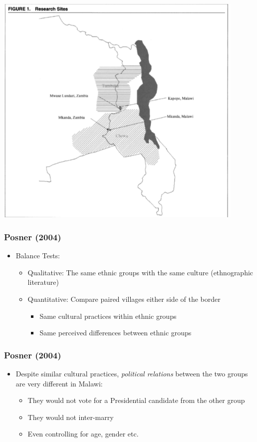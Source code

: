 \documentclass[xcolor=x11names,compress]{beamer}\usepackage[]{graphicx}\usepackage[]{color}
\renewcommand{\(}{\begin{columns}}
\renewcommand{\)}{\end{columns}}
\newcommand{\<}[1]{\begin{column}{#1}}
\renewcommand{\>}{\end{column}}
\begin{document}
\begin{frame}
\includegraphics[width=0.9\textwidth]{Posner_map.png}
\end{frame}

\begin{frame}
\frametitle{Posner (2004)}
\begin{itemize}
\item Balance Tests:
\begin{itemize}
\item Qualitative: The same ethnic groups with the same culture (ethnographic literature)
\pause
\item Quantitative: Compare paired villages either side of the border
\pause
\begin{itemize}
\item Same cultural practices within ethnic groups
\pause
\item Same perceived differences between ethnic groups
\end{itemize}
\end{itemize}
\end{itemize}
\end{frame}

\begin{frame}
\frametitle{Posner (2004)}
\begin{itemize}
\item Despite similar cultural practices, \textit{political relations} between the two groups are very different in Malawi:
\pause
\begin{itemize}
\item They would not vote for a Presidential candidate from the other group
\pause
\item They would not inter-marry
\pause
\item Even controlling for age, gender etc.
\end{itemize}
\end{itemize}
\end{frame}
\end{document}
